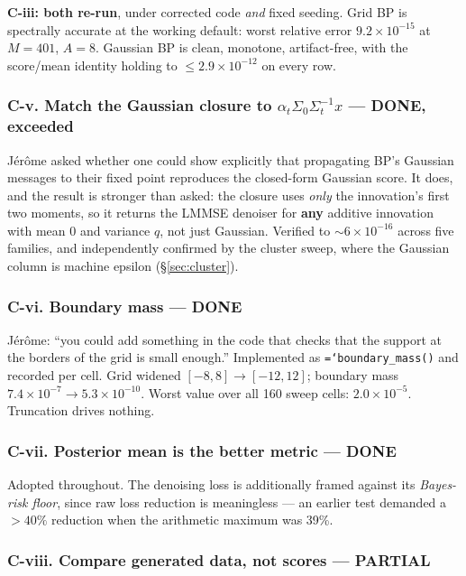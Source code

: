 \documentclass[11pt,a4paper]{article}
\newcommand{\done}{\textcolor{GoodGreen}{\textbf{DONE}}}
\newcommand{\partialx}{\textcolor{WarnAmber}{\textbf{PARTIAL}}}
\newcommand{\code}[1]{\texttt{\small\hyphenchar\font=`\-\relax #1}}
\begin{document}
\textbf{C-iii: both re-run}, under corrected code \emph{and} fixed seeding. Grid BP is
spectrally accurate at the working default: worst relative error $9.2\times10^{-15}$ at
$M=401$, $A=8$. Gaussian BP is clean, monotone, artifact-free, with the score/mean identity
holding to $\le 2.9\times10^{-12}$ on every row.

\subsubsection*{C-v. Match the Gaussian closure to $\alpha_t\Sigma_0\Sigma_t^{-1}x$ --- \done, exceeded}

J\'er\^ome asked whether one could show explicitly that propagating BP's Gaussian messages
to their fixed point reproduces the closed-form Gaussian score. It does, and the result is
stronger than asked: the closure uses \emph{only} the innovation's first two moments, so it
returns the LMMSE denoiser for \textbf{any} additive innovation with mean 0 and variance
$q$, not just Gaussian. Verified to $\sim 6\times10^{-16}$ across five families, and
independently confirmed by the cluster sweep, where the Gaussian column is machine epsilon
(\S\ref{sec:cluster}).

\subsubsection*{C-vi. Boundary mass --- \done}

J\'er\^ome: ``you could add something in the code that checks that the support at the borders
of the grid is small enough.'' Implemented as \code{boundary\_mass()} and recorded per cell.
Grid widened $[-8,8]\to[-12,12]$; boundary mass $7.4\times10^{-7} \to 5.3\times10^{-10}$.
Worst value over all 160 sweep cells: $2.0\times10^{-5}$. Truncation drives nothing.

\subsubsection*{C-vii. Posterior mean is the better metric --- \done}

Adopted throughout. The denoising loss is additionally framed against its \emph{Bayes-risk
floor}, since raw loss reduction is meaningless --- an earlier test demanded a $>40\%$
reduction when the arithmetic maximum was 39\%.

\subsubsection*{C-viii. Compare generated data, not scores --- \partialx}
\end{document}
